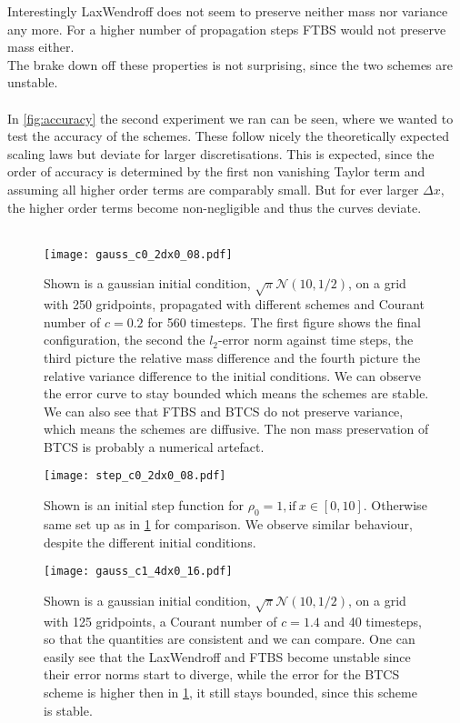 Interestingly LaxWendroff does not seem to preserve neither mass nor variance any more. For a higher number of propagation steps FTBS would not preserve mass either.\\
The brake down off these properties is not surprising, since the two schemes are unstable.  \\ \\
In \cref{fig:accuracy} the second experiment we ran can be seen, where we wanted to test the accuracy of the schemes. These follow nicely the theoretically expected scaling laws but deviate for larger discretisations. This is expected, since the order of accuracy is determined by the first non vanishing Taylor term and assuming all higher order terms are comparably small. But for ever larger $\Delta x$, the higher order terms become non-negligible and thus the curves deviate. \\ \\
\begin{figure}[h!]
\centering
\texttt{[image: gauss\_c0\_2dx0\_08.pdf]}
\caption{Shown is a gaussian initial condition, $\sqrt{\pi}\mathcal{N}(10,1/2)$, on a grid with 250 gridpoints, propagated with different schemes and Courant number of $c=0.2$ for 560 timesteps. The first figure shows the final configuration, the second the $l_2$-error norm against time steps, the third picture the relative mass difference and the fourth picture the relative variance difference to the initial conditions. We can observe the error curve to stay bounded which means the schemes are stable. We can also see that FTBS and BTCS do not preserve variance, which means the schemes are diffusive. The non mass preservation of BTCS is probably a numerical artefact. }\label{fig:gauss_stable}
\end{figure}
\begin{figure}
\centering
\texttt{[image: step\_c0\_2dx0\_08.pdf]}
\caption{Shown is an initial step function for $\rho_0 = 1,  \text{if}\ x \in [0,10] $. Otherwise same set up as in \cref{fig:gauss_stable} for comparison. We observe similar behaviour, despite the different initial conditions. }\label{fig:step_stable}

\texttt{[image: gauss\_c1\_4dx0\_16.pdf]}
\caption{Shown is a gaussian initial condition, $\sqrt{\pi}\mathcal{N}(10,1/2)$, on a grid with 125 gridpoints, a Courant number of $c=1.4$ and 40 timesteps, so that the quantities are  consistent and we can compare. One can easily see that the LaxWendroff and FTBS become unstable since their error norms start to diverge, while the error for the BTCS scheme is higher then in \cref{fig:gauss_stable}, it still stays bounded, since this scheme is stable.}\label{fig:gauss_unstable}
\end{figure}
